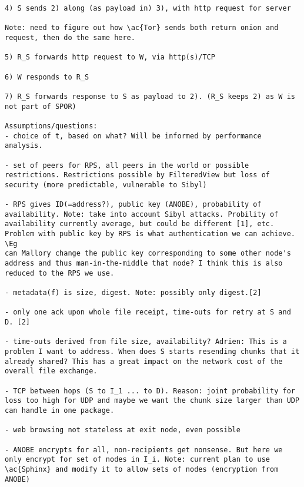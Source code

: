 \begin{verbatim}
4) S sends 2) along (as payload in) 3), with http request for server

Note: need to figure out how \ac{Tor} sends both return onion and request, then do the same here.

5) R_S forwards http request to W, via http(s)/TCP

6) W responds to R_S

7) R_S forwards response to S as payload to 2). (R_S keeps 2) as W is not part of SPOR) 

Assumptions/questions:
- choice of t, based on what? Will be informed by performance analysis.

- set of peers for RPS, all peers in the world or possible restrictions. Restrictions possible by FilteredView but loss of security (more predictable, vulnerable to Sibyl)

- RPS gives ID(=address?), public key (ANOBE), probability of availability. Note: take into account Sibyl attacks. Probility of availability currently average, but could be different [1], etc. Problem with public key by RPS is what authentication we can achieve. \Eg 
can Mallory change the public key corresponding to some other node's 
address and thus man-in-the-middle that node? I think this is also 
reduced to the RPS we use.

- metadata(f) is size, digest. Note: possibly only digest.[2]

- only one ack upon whole file receipt, time-outs for retry at S and D. [2]

- time-outs derived from file size, availability? Adrien: This is a problem I want to address. When does S starts resending chunks that it already shared? This has a great impact on the network cost of the overall file exchange.

- TCP between hops (S to I_1 ... to D). Reason: joint probability for loss too high for UDP and maybe we want the chunk size larger than UDP can handle in one package.

- web browsing not stateless at exit node, even possible

- ANOBE encrypts for all, non-recipients get nonsense. But here we only encrypt for set of nodes in I_i. Note: current plan to use \ac{Sphinx} and modify it to allow sets of nodes (encryption from ANOBE)



\end{verbatim}
